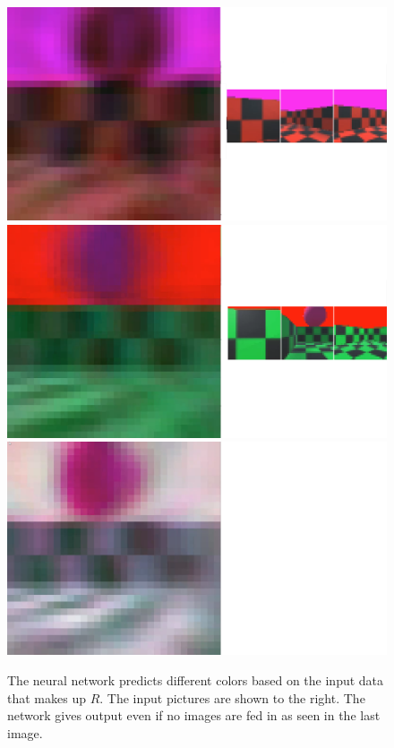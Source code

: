 \begin{figure}[p]
  \centering
  \includegraphics[height=\imgWithTripple]{images/workflow/FunctionalF1.png} \\[\picVdist]
  \includegraphics[height=\imgWithTripple]{images/workflow/FunctionalF2.png} \\[\picVdist]
  \includegraphics[height=\imgWithTripple]{images/workflow/FunctionalF3.png}
  \caption{The neural network predicts different colors based on the input data that makes up $R$. The input pictures are shown to the right. The network gives output even if no images are fed in as seen in the last image.}
  \label{FunctionalFirstPerson}
\end{figure}

